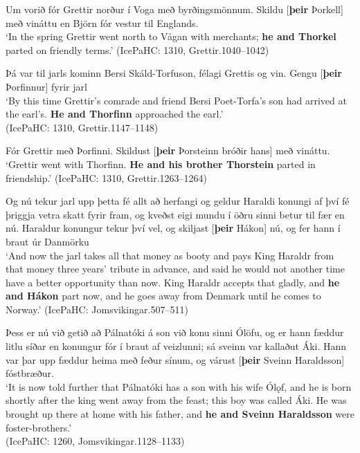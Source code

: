 \documentclass[output=paper,colorlinks,citecolor=brown]{langscibook}
\begin{document}
\begin{exe}
    \ex \label{old-non-assoc}  %
    \begin{xlist}
        \ex Um vorið fór Grettir norður í Voga með byrðingsmönnum. Skildu [\textbf{þeir} Þorkell] með vináttu en Björn fór vestur til Englands.\\ 
        `In the spring Grettir went north to Vågan with merchants; \textbf{he and Thorkel} parted on friendly terms.'  
        (IcePaHC: 1310, Grettir.1040--1042)
       \begin{sloppypar}

        \ex Þá var til jarls kominn Bersi Skáld-Torfuson, félagi Grettis og vin. Gengu [\textbf{þeir} Þorfinnur] fyrir jarl\\ 
        `By this time Grettir's comrade and friend Bersi Poet-Torfa's son had arrived at the earl's. \textbf{He and Thorfinn} approached the earl.' \\ 
        (IcePaHC: 1310, Grettir.1147--1148)
        \end{sloppypar} 

        \ex Fór Grettir með Þorfinni. Skildust [\textbf{þeir} Þorsteinn bróðir hans] með vináttu. \\ 
        `Grettir went with Thorfinn. \textbf{He and his brother Thorstein} parted in friendship.' (IcePaHC: 1310, Grettir.1263--1264) 

        \ex Og nú tekur jarl upp þetta fé allt að herfangi og geldur Haraldi konungi af því fé þriggja vetra skatt fyrir fram, og kveðst eigi mundu í öðru sinni betur til fær en nú. Haraldur konungur tekur því vel, og skiljast [\textbf{þeir} Hákon] nú, og fer hann í braut úr Danmörku\\ 
        `And now the jarl takes all that money as booty and pays King Haraldr from that money three years’ tribute in advance, and said he would not another time have a better opportunity than now. King Haraldr accepts that gladly, and \textbf{he and Hákon} part now, and he goes away from Denmark until he comes to Norway.' 
        (IcePaHC: Jomsvikingar.507--511)

        \ex Þess er nú við getið að Pálnatóki á son við konu sinni Ólöfu, og er hann fæddur litlu síðar en konungur fór í braut af veizlunni; sá sveinn var kallaðut Áki. Hann var þar upp fæddur heima með feður sínum, og várust [\textbf{þeir} Sveinn Haraldsson] fóstbræður.\\ 
        `It is now told further that Pálnatóki has a son with his wife Ólǫf, and he is born shortly after the king went away from the feast; this boy was called Áki. He was brought up there at home with his father, and \textbf{he and Sveinn Haraldsson} were foster-brothers.' \\ 
        (IcePaHC: 1260, Jomsvikingar.1128--1133) 
    \end{xlist}
\end{exe}
\end{document}
